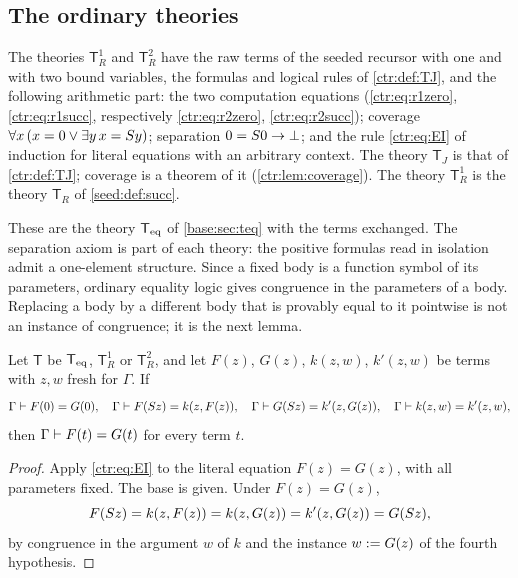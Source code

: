 \subsection{The ordinary theories}

\begin{definition}\label{ctr:def:ordinary}
The theories $\mathsf T_R^1$ and $\mathsf T_R^2$ have the raw terms of the seeded recursor
with one and with two bound variables, the formulas and logical rules of
\cref{ctr:def:TJ}, and the following arithmetic part: the two computation equations
(\eqref{ctr:eq:r1zero}, \eqref{ctr:eq:r1succ}, respectively \eqref{ctr:eq:r2zero},
\eqref{ctr:eq:r2succ}); coverage $\forall x\,(x=0\lor\exists y\,x=S y)$; separation
$0=S 0\to\bot$; and the rule \eqref{ctr:eq:EI} of induction for literal equations with an
arbitrary context. The theory $\mathsf T_J$ is that of \cref{ctr:def:TJ}; coverage is a
theorem of it (\cref{ctr:lem:coverage}). The theory $\mathsf T_R^1$ is the theory
$\mathsf T_R$ of \cref{seed:def:succ}.
\end{definition}

These are the theory $\mathsf{T}_{\mathrm{eq}}$ of \cref{base:sec:teq} with the terms exchanged. The separation
axiom is part of each theory: the positive formulas read in isolation admit a one-element
structure. Since a fixed body is a function symbol of its parameters, ordinary equality
logic gives congruence in the parameters of a body. Replacing a body by a different body
that is provably equal to it pointwise is not an instance of congruence; it is the next
lemma.

\begin{lemma}\label{ctr:lem:unique}
Let $\mathsf T$ be $\mathsf{T}_{\mathrm{eq}}$, $\mathsf T_R^1$ or $\mathsf T_R^2$, and let $F(z)$, $G(z)$,
$k(z,w)$, $k'(z,w)$ be terms with $z,w$ fresh for $\Gamma$. If
\[
 \Gamma\vdash F(0)=G(0),\quad \Gamma\vdash F(S z)=k(z,F(z)),\quad
 \Gamma\vdash G(S z)=k'(z,G(z)),\quad \Gamma\vdash k(z,w)=k'(z,w),
\]
then $\Gamma\vdash F(t)=G(t)$ for every term $t$.
\end{lemma}
\begin{proof}
Apply \eqref{ctr:eq:EI} to the literal equation $F(z)=G(z)$, with all parameters fixed. The
base is given. Under $F(z)=G(z)$,
\[
 F(S z)=k(z,F(z))=k(z,G(z))=k'(z,G(z))=G(S z),
\]
by congruence in the argument $w$ of $k$ and the instance $w\mathrel{:=} G(z)$ of the fourth
hypothesis.
\end{proof}

